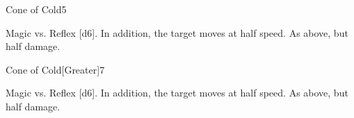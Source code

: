\begin{spellsection}{Cone of Cold}{5}
\begin{spellheader}
\end{spellheader}
\begin{spellcontent}
    \begin{spelltargetinginfo}
    \end{spelltargetinginfo}
    \begin{spelleffects}
        \begin{spellattack}{Magic vs. Reflex}
            \spellsuccess {}[d6]. In addition, the target moves at half speed.
            \spellfailure As above, but half damage.
        \end{spellattack}
        \spelldur \durshort
    \end{spelleffects}
\end{spellcontent}
\begin{spellfooter}
\end{spellfooter}
\end{spellsection}

\begin{spellsection}{Cone of Cold}[Greater]{7}
\begin{spellheader}
\end{spellheader}
\begin{spellcontent}
    \begin{spelltargetinginfo}
    \end{spelltargetinginfo}
    \begin{spelleffects}
        \begin{spellattack}{Magic vs. Reflex}
            \spellsuccess {}[d6]. In addition, the target moves at half speed.
            \spellfailure As above, but half damage.
        \end{spellattack}
    \end{spelleffects}
\end{spellcontent}
\begin{spellfooter}
\end{spellfooter}
\end{spellsection}

